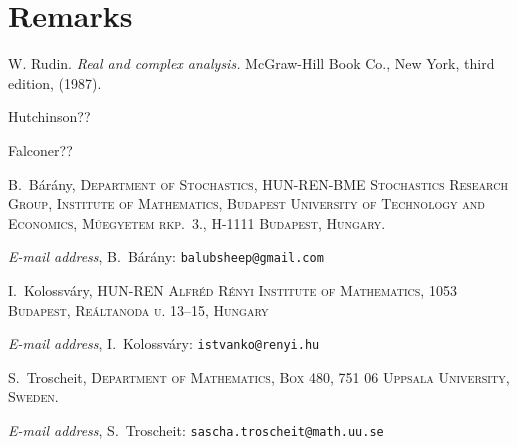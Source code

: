 \documentclass[12pt,]{article}
\makeatletter
\theoremstyle{definition}
\theoremstyle{remark}
\newcommand{\0}{\mathbf{0}}
\newcommand{\Addresses}{{%
  \bigskip
  \footnotesize

  B.~B\'ar\'any, \textsc{Department of Stochastics, HUN-REN-BME Stochastics Research Group,
  Institute of Mathematics, Budapest University of Technology and Economics, M\H{u}egyetem rkp.~3.,
H-1111 Budapest, Hungary.}\par\nopagebreak
  \textit{E-mail address}, B.~B\'ar\'any: \texttt{balubsheep@gmail.com}

  \medskip

  I.~Kolossv\'ary, \textsc{HUN-REN Alfréd Rényi Institute of Mathematics, 1053 Budapest, Reáltanoda u.
13–15, Hungary}\par\nopagebreak
  \textit{E-mail address}, I.~Kolossv\'ary: \texttt{istvanko@renyi.hu}
   \medskip


  S.~Troscheit, \textsc{Department of Mathematics, Box 480, 751 06 Uppsala University, Sweden.}\par\nopagebreak
  \textit{E-mail address}, S.~Troscheit: \texttt{sascha.troscheit@math.uu.se}
}}
\makeatother
\begin{document}
\section{Remarks}



\begin{thebibliography}{99}
  W. Rudin. 
  \textit{Real and complex analysis.}
  McGraw-Hill Book Co., New York, third edition, (1987).

  Hutchinson??

  Falconer??

\end{thebibliography}

\Addresses
\end{document}
